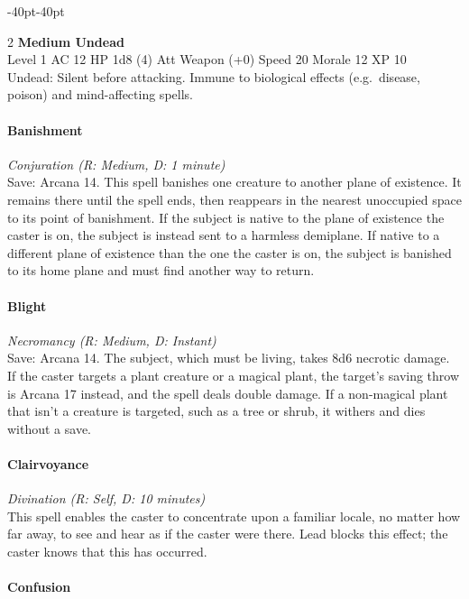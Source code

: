 \documentclass{book}
\begin{document}
\begin{adjustwidth}{-40pt}{-40pt}
\begin{multicols}{2}
\textbf{Medium Undead}\\
Level 1 AC 12 HP 1d8 (4) Att Weapon (+0) Speed 20 Morale 12 XP 10\\
Undead: Silent before attacking. Immune to biological effects
(e.g.~disease, poison) and mind-affecting spells.

\paragraph{Banishment}\label{banishment}

\emph{Conjuration (R: Medium, D: 1 minute)}\\
Save: Arcana 14. This spell banishes one creature to another plane of
existence. It remains there until the spell ends, then reappears in the
nearest unoccupied space to its point of banishment. If the subject is
native to the plane of existence the caster is on, the subject is
instead sent to a harmless demiplane. If native to a different plane of
existence than the one the caster is on, the subject is banished to its
home plane and must find another way to return.

\paragraph{Blight}\label{blight}

\emph{Necromancy (R: Medium, D: Instant)}\\
Save: Arcana 14. The subject, which must be living, takes 8d6 necrotic
damage. If the caster targets a plant creature or a magical plant, the
target's saving throw is Arcana 17 instead, and the spell deals double
damage. If a non-magical plant that isn't a creature is targeted, such
as a tree or shrub, it withers and dies without a save.

\paragraph{Clairvoyance}\label{clairvoyance}

\emph{Divination (R: Self, D: 10 minutes)}\\
This spell enables the caster to concentrate upon a familiar locale, no
matter how far away, to see and hear as if the caster were there. Lead
blocks this effect; the caster knows that this has occurred.

\paragraph{Confusion}\label{confusion}


\end{multicols}
\end{adjustwidth}
\end{document}

